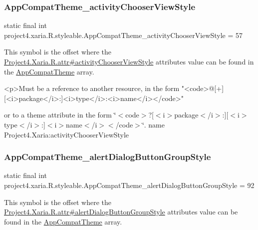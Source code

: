 \subsubsection{\texorpdfstring{App\+Compat\+Theme\+\_\+activity\+Chooser\+View\+Style}{AppCompatTheme\_activityChooserViewStyle}}
{\footnotesize\ttfamily static final int project4.\+xaria.\+R.\+styleable.\+App\+Compat\+Theme\+\_\+activity\+Chooser\+View\+Style = 57\hspace{0.3cm}{\ttfamily [static]}}

This symbol is the offset where the \hyperlink{}{Project4.\+Xaria.\+R.\+attr\#activity\+Chooser\+View\+Style} attribute\textquotesingle{}s value can be found in the \hyperlink{classproject4_1_1xaria_1_1R_1_1styleable_aad8bec413e2350f9404e6ff0e831a85d}{App\+Compat\+Theme} array.

\begin{DoxyVerb}      <p>Must be a reference to another resource, in the form "<code>@[+][<i>package</i>:]<i>type</i>:<i>name</i></code>"
\end{DoxyVerb}
 or to a theme attribute in the form \char`\"{}$<$code$>$?\mbox{[}$<$i$>$package$<$/i$>$\+:\mbox{]}\mbox{[}$<$i$>$type$<$/i$>$\+:\mbox{]}$<$i$>$name$<$/i$>$$<$/code$>$\char`\"{}.  name Project4.\+Xaria\+:activity\+Chooser\+View\+Style \mbox{\label{classproject4_1_1xaria_1_1R_1_1styleable_acb4a414bfb83d9548273fc395f7089bd}} 
\subsubsection{\texorpdfstring{App\+Compat\+Theme\+\_\+alert\+Dialog\+Button\+Group\+Style}{AppCompatTheme\_alertDialogButtonGroupStyle}}
{\footnotesize\ttfamily static final int project4.\+xaria.\+R.\+styleable.\+App\+Compat\+Theme\+\_\+alert\+Dialog\+Button\+Group\+Style = 92\hspace{0.3cm}{\ttfamily [static]}}

This symbol is the offset where the \hyperlink{}{Project4.\+Xaria.\+R.\+attr\#alert\+Dialog\+Button\+Group\+Style} attribute\textquotesingle{}s value can be found in the \hyperlink{classproject4_1_1xaria_1_1R_1_1styleable_aad8bec413e2350f9404e6ff0e831a85d}{App\+Compat\+Theme} array.

